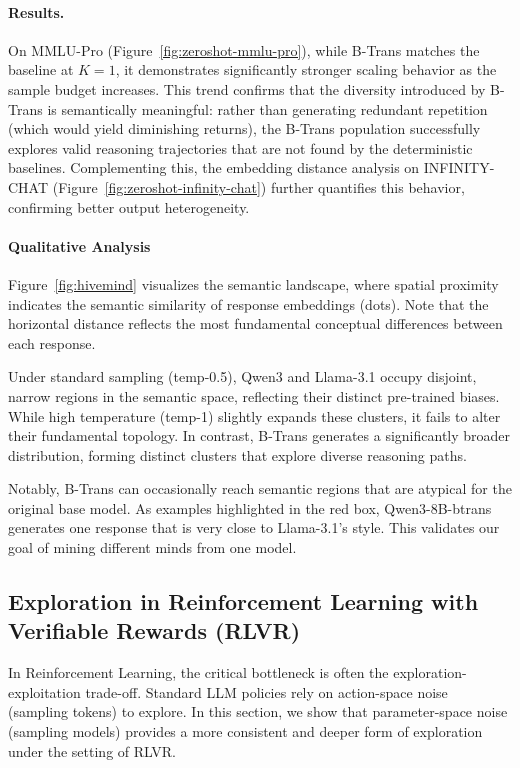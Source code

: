 \documentclass[11pt]{article}
\begin{document}
\paragraph{Results.}
On MMLU-Pro (Figure~\ref{fig:zeroshot-mmlu-pro}), while B-Trans matches the baseline at $K=1$, it demonstrates significantly stronger scaling behavior as the sample budget increases. This trend confirms that the diversity introduced by B-Trans is semantically meaningful: rather than generating redundant repetition (which would yield diminishing returns), the B-Trans population successfully explores valid reasoning trajectories that are not found by the deterministic baselines. 
Complementing this, the embedding distance analysis on INFINITY-CHAT (Figure~\ref{fig:zeroshot-infinity-chat}) further quantifies this behavior, confirming better output heterogeneity.

\paragraph{Qualitative Analysis} 
Figure~\ref{fig:hivemind} visualizes the semantic landscape, where spatial proximity indicates the semantic similarity of response embeddings (dots). Note that the horizontal distance reflects the most fundamental conceptual differences between each response.

Under standard sampling (temp-0.5), Qwen3 and Llama-3.1 occupy disjoint, narrow regions in the semantic space, reflecting their distinct pre-trained biases. 
While high temperature (temp-1) slightly expands these clusters, it fails to alter their fundamental topology. 
In contrast, B-Trans generates a significantly broader distribution, forming distinct clusters that explore diverse reasoning paths. 

Notably, B-Trans can occasionally reach semantic regions that are atypical for the original base model. As examples highlighted in the red box, Qwen3-8B-btrans generates one response that is very close to Llama-3.1's style. This validates our goal of mining different minds from one model.


\subsection{Exploration in Reinforcement Learning with Verifiable Rewards (RLVR)}
\label{subsec:exp_rlvr}
In Reinforcement Learning, the critical bottleneck is often the exploration-exploitation trade-off. Standard LLM policies rely on action-space noise (sampling tokens) to explore. In this section, we show that parameter-space noise (sampling models) provides a more consistent and deeper form of exploration under the setting of RLVR. 
\end{document}
